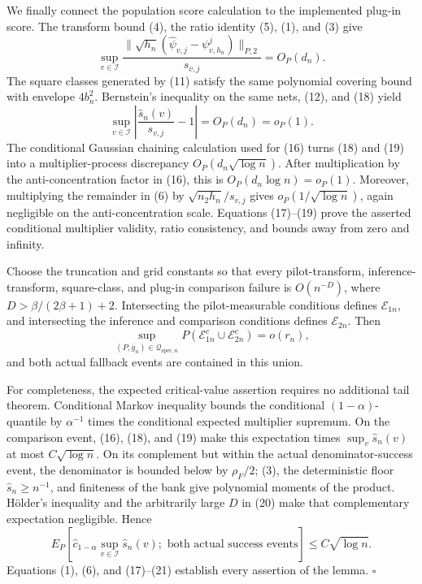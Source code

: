 We finally connect the population score calculation to the implemented plug-in score. The transform bound (4), the ratio identity (5), (1), and (3) give
\[
 \sup_{v\in\mathcal I}
 \frac{\|\sqrt{h_n}(\widehat\psi_{v,j}-\psi^j_{v,h_n})\|_{P,2}}{s_{v,j}}
 =O_P(d_n). \tag{18}
\]
The square classes generated by (11) satisfy the same polynomial covering bound with envelope \(4b_n^2\). Bernstein's inequality on the same nets, (12), and (18) yield
\[
 \sup_{v\in\mathcal I}\left|\frac{\widehat s_n(v)}{s_{v,j}}-1\right|=O_P(d_n)=o_P(1). \tag{19}
\]
The conditional Gaussian chaining calculation used for (16) turns (18) and (19) into a multiplier-process discrepancy \(O_P(d_n\sqrt{\log n})\). After multiplication by the anti-concentration factor in (16), this is \(O_P(d_n\log n)=o_P(1)\). Moreover, multiplying the remainder in (6) by \(\sqrt{n_2h_n}/s_{v,j}\) gives \(o_P(1/\sqrt{\log n})\), again negligible on the anti-concentration scale. Equations (17)--(19) prove the asserted conditional multiplier validity, ratio consistency, and bounds away from zero and infinity.

Choose the truncation and grid constants so that every pilot-transform, inference-transform, square-class, and plug-in comparison failure is \(O(n^{-D})\), where \(D>\beta/(2\beta+1)+2\). Intersecting the pilot-measurable conditions defines \(\mathcal E_{1n}\), and intersecting the inference and comparison conditions defines \(\mathcal E_{2n}\). Then
\[
 \sup_{(P,\bar g_n)\in\mathcal Q_{\mathrm{spec},n}}
 P(\mathcal E_{1n}^c\cup\mathcal E_{2n}^c)=o(r_n), \tag{20}
\]
and both actual fallback events are contained in this union.

For completeness, the expected critical-value assertion requires no additional tail theorem. Conditional Markov inequality bounds the conditional \((1-\alpha)\)-quantile by \(\alpha^{-1}\) times the conditional expected multiplier supremum. On the comparison event, (16), (18), and (19) make this expectation times \(\sup_v\widehat s_n(v)\) at most \(C\sqrt{\log n}\). On its complement but within the actual denominator-success event, the denominator is bounded below by \(\rho_F/2\); (3), the deterministic floor \(\widehat s_n\ge n^{-1}\), and finiteness of the bank give polynomial moments of the product. H\"older's inequality and the arbitrarily large \(D\) in (20) make that complementary expectation negligible. Hence
\[
 E_P\!\left[\widehat c_{1-\alpha}\sup_{v\in\mathcal I}\widehat s_n(v);
 \text{ both actual success events}\right]\le C\sqrt{\log n}. \tag{21}
\]
Equations (1), (6), and (17)--(21) establish every assertion of the lemma. \(\square\)